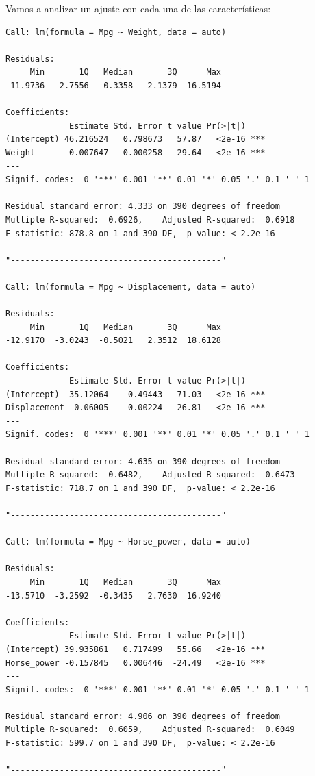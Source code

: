 Vamos a analizar un ajuste con cada una de las características:

\begin{verbatim}
Call: lm(formula = Mpg ~ Weight, data = auto)

Residuals:
     Min       1Q   Median       3Q      Max 
-11.9736  -2.7556  -0.3358   2.1379  16.5194 

Coefficients:
             Estimate Std. Error t value Pr(>|t|)    
(Intercept) 46.216524   0.798673   57.87   <2e-16 ***
Weight      -0.007647   0.000258  -29.64   <2e-16 ***
---
Signif. codes:  0 '***' 0.001 '**' 0.01 '*' 0.05 '.' 0.1 ' ' 1

Residual standard error: 4.333 on 390 degrees of freedom
Multiple R-squared:  0.6926,    Adjusted R-squared:  0.6918 
F-statistic: 878.8 on 1 and 390 DF,  p-value: < 2.2e-16

"-------------------------------------------"

Call: lm(formula = Mpg ~ Displacement, data = auto)

Residuals:
     Min       1Q   Median       3Q      Max 
-12.9170  -3.0243  -0.5021   2.3512  18.6128 

Coefficients:
             Estimate Std. Error t value Pr(>|t|)    
(Intercept)  35.12064    0.49443   71.03   <2e-16 ***
Displacement -0.06005    0.00224  -26.81   <2e-16 ***
---
Signif. codes:  0 '***' 0.001 '**' 0.01 '*' 0.05 '.' 0.1 ' ' 1

Residual standard error: 4.635 on 390 degrees of freedom
Multiple R-squared:  0.6482,    Adjusted R-squared:  0.6473 
F-statistic: 718.7 on 1 and 390 DF,  p-value: < 2.2e-16

"-------------------------------------------"

Call: lm(formula = Mpg ~ Horse_power, data = auto)

Residuals:
     Min       1Q   Median       3Q      Max 
-13.5710  -3.2592  -0.3435   2.7630  16.9240 

Coefficients:
             Estimate Std. Error t value Pr(>|t|)    
(Intercept) 39.935861   0.717499   55.66   <2e-16 ***
Horse_power -0.157845   0.006446  -24.49   <2e-16 ***
---
Signif. codes:  0 '***' 0.001 '**' 0.01 '*' 0.05 '.' 0.1 ' ' 1

Residual standard error: 4.906 on 390 degrees of freedom
Multiple R-squared:  0.6059,    Adjusted R-squared:  0.6049 
F-statistic: 599.7 on 1 and 390 DF,  p-value: < 2.2e-16

"-------------------------------------------"


\end{verbatim}
